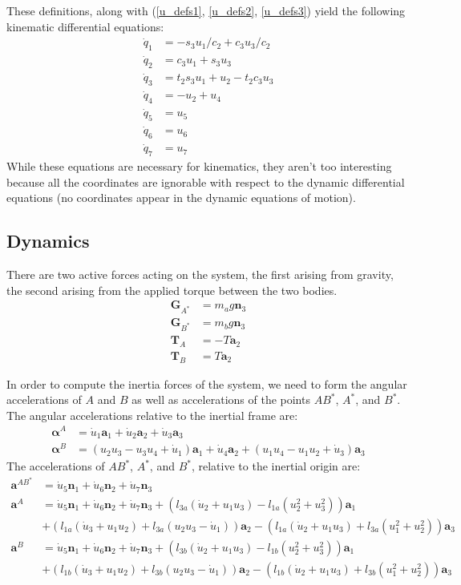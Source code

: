 \documentclass[letterpaper,11pt]{article}
\newcommand{\bs}[1]{ \boldsymbol{ #1 } }
\begin{document}
These definitions, along with (\ref{u_defs1}, \ref{u_defs2}, \ref{u_defs3})
yield the following kinematic differential equations:
\begin{align*}
  \dot{q}_1 &=  -s_3u_1/c_2 + c_3u_3/c_2\\
  \dot{q}_2 &=  c_3u_1 + s_3u_3 \\
  \dot{q}_3 &=  t_2s_3u_1 + u_2 - t_2c_3u_3 \\
  \dot{q}_4 &= -u_2 +  u_4 \\
  \dot{q}_5 &= u_5 \\
  \dot{q}_6 &= u_6 \\
  \dot{q}_7 &= u_7
\end{align*}
While these equations are necessary for kinematics, they aren't too interesting
because all the coordinates are ignorable with respect to the dynamic
differential equations (no coordinates appear in the dynamic equations of
motion).

\subsection*{Dynamics}
There are two active forces acting on the system, the first arising
from gravity, the second arising from the applied torque between the two
bodies.
\begin{align*}
  \bs{G}_{A^*} & = m_ag\bs{n}_3 \\
  \bs{G}_{B^*} & = m_bg\bs{n}_3 \\
  \bs{T}_A & = - T \bs{a}_2 \\
  \bs{T}_B & = T \bs{a}_2
\end{align*}

In order to compute the inertia forces of the system, we need to form the
angular accelerations of $A$ and $B$ as well as accelerations of the points
$AB^*$, $A^*$, and $B^*$. The angular accelerations relative to the inertial
frame are:
\begin{align*}
  \bs{\alpha}^A & = \dot{u}_1 \bs{a}_1 + \dot{u}_2 \bs{a}_2 + \dot{u}_3 \bs{a}_3\\
  \bs{\alpha}^B & =(u_2u_3 - u_3u_4 + \dot{u}_1)\bs{a}_1 + \dot{u}_4\bs{a}_2 + (u_1u_4 -
  u_1u_2 + \dot{u}_3)\bs{a}_3
\end{align*}
The accelerations of $AB^*$, $A^*$, and $B^*$, relative to the inertial
origin are:
\begin{align*}
  \bs{a}^{AB^*} &= \dot{u}_5\bs{n}_1 + \dot{u}_6\bs{n}_2 + \dot{u}_7\bs{n}_3
  \\
  \bs{a}^A &= \dot{u}_5\bs{n}_1 + \dot{u}_6\bs{n}_2 + \dot{u}_7\bs{n}_3
  + (l_{3a}(\dot{u}_2 + u_1u_3) - l_{1a}(u_2^2 + u_3^2))\bs{a}_1 \\
  &+ (l_{1a}(\dot{u}_3 + u_1u_2) + l_{3a}(u_2u_3 - \dot{u}_1))\bs{a}_2
  - (l_{1a}(\dot{u}_2 + u_1u_3) + l_{3a}(u_1^2 + u_2^2))\bs{a}_3
  \\
  \bs{a}^B &= \dot{u}_5\bs{n}_1 + \dot{u}_6\bs{n}_2 + \dot{u}_7\bs{n}_3
  + (l_{3b}(\dot{u}_2 + u_1u_3) - l_{1b}(u_2^2 + u_3^2))\bs{a}_1 \\
  &+ (l_{1b}(\dot{u}_3 + u_1u_2) + l_{3b}(u_2u_3 - \dot{u}_1))\bs{a}_2
  - (l_{1b}(\dot{u}_2 + u_1u_3) + l_{3b}(u_1^2 + u_2^2))\bs{a}_3
\end{align*}
\end{document}
